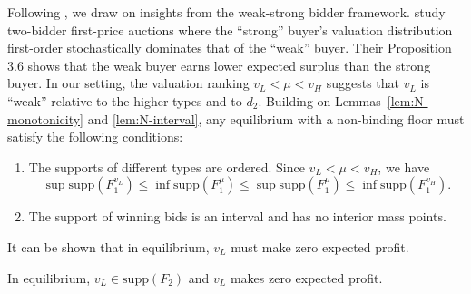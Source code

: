 \noindent Following \textcite{maskinAsymmetricAuctions2000}, we draw on insights from the weak-strong bidder framework. \textcite{maskinAsymmetricAuctions2000} study two-bidder first-price auctions where the ``strong'' buyer's valuation distribution first-order stochastically dominates that of the ``weak'' buyer. Their Proposition 3.6 shows that the weak buyer earns lower expected surplus than the strong buyer. In our setting, the valuation ranking $v_L < \mu < v_H$ suggests that $v_L$ is ``weak'' relative to the higher types and to $d_2$. Building on Lemmas~\ref{lem:N-monotonicity} and \ref{lem:N-interval}, any equilibrium with a non-binding floor must satisfy the following conditions:

\begin{enumerate}
\item The supports of different types are ordered. Since $v_L < \mu < v_H$, we have
\[
\sup \text{supp}(F_1^{v_L}) \leq \inf \text{supp}(F_1^{\mu}) \leq \sup \text{supp}(F_1^{\mu}) \leq \inf \text{supp}(F_1^{v_H}).
\]

\item The support of winning bids is an interval and has no interior mass points.
\end{enumerate}

\noindent It can be shown that in equilibrium, $v_L$ must make zero expected profit.

\begin{lem}\label{lem:nonbinding-zero-profit}
In equilibrium, $v_L \in \text{supp}(F_2)$ and $v_L$ makes zero expected profit.
\end{lem}

